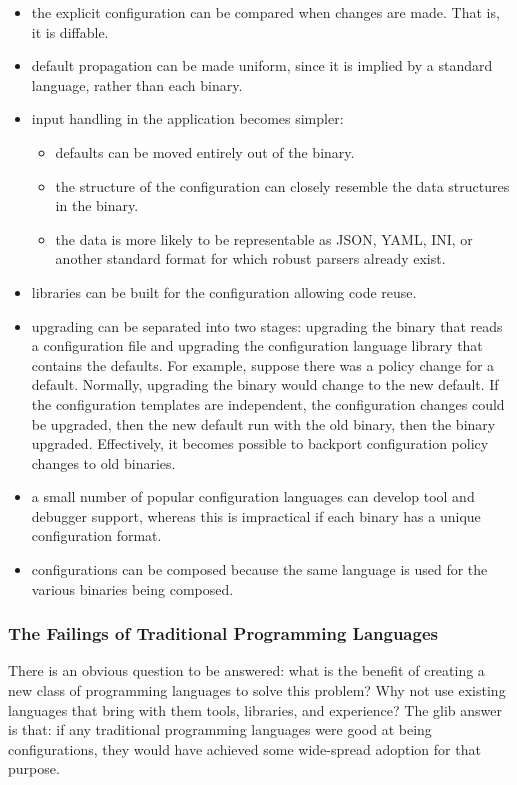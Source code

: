 \documentclass[letterpaper,twocolumn,10pt]{article}
\begin{document}
\begin{itemize}
\item the explicit configuration can be compared when changes are made. That is, it is diffable.
\item default propagation can be made uniform, since it is implied by a standard language, rather than each binary.
\item input handling in the application becomes simpler:
	\begin{itemize}
	\item defaults can be moved entirely out of the binary.
	\item the structure of the configuration can closely resemble the data structures in the binary.
	\item the data is more likely to be representable as JSON, YAML, INI, or another standard format for which robust parsers already exist.
  \end{itemize}
\item libraries can be built for the configuration allowing code reuse.
\item upgrading can be separated into two stages: upgrading the binary that reads a configuration file and upgrading the configuration language library that contains the defaults. For example, suppose there was a policy change for a default. Normally, upgrading the binary would change to the new default. If the configuration templates are independent, the configuration changes could be upgraded, then the new default run with the old binary, then the binary upgraded. Effectively, it becomes possible to backport configuration policy changes to old binaries.
\item a small number of popular configuration languages can develop tool and debugger support, whereas this is impractical if each binary has a unique configuration format.
\item configurations can be composed because the same language is used for the various binaries being composed.
\end{itemize}

\subsubsection{The Failings of Traditional Programming Languages}
There is an obvious question to be answered: what is the benefit of creating a new class of programming languages to solve this problem? Why not use existing languages that bring with them tools, libraries, and experience? The glib answer is that: if any traditional programming languages were good at being configurations, they would have achieved some wide-spread adoption for that purpose.
\end{document}
